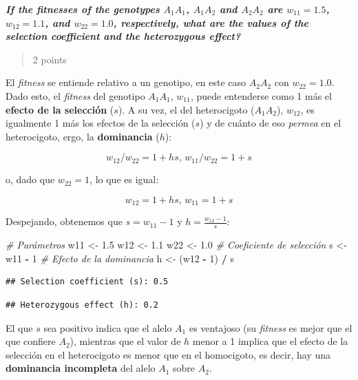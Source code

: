 \documentclass[
  11pt,
]{article}
\newenvironment{Shaded}{\begin{snugshade}}{\end{snugshade}}
\newcommand{\CommentTok}[1]{\textcolor[rgb]{0.56,0.35,0.01}{\textit{#1}}}
\newcommand{\DecValTok}[1]{\textcolor[rgb]{0.00,0.00,0.81}{#1}}
\newcommand{\FloatTok}[1]{\textcolor[rgb]{0.00,0.00,0.81}{#1}}
\newcommand{\NormalTok}[1]{#1}
\newcommand{\OtherTok}[1]{\textcolor[rgb]{0.56,0.35,0.01}{#1}}
\newcommand{\SpecialCharTok}[1]{\textcolor[rgb]{0.81,0.36,0.00}{\textbf{#1}}}
\begin{document}
\textbf{\emph{If the fitnesses of the genotypes \(A_{1}A_1\),
\(A_{1}A_2\) and \(A_{2}A_2\) are \(w_{11} = 1.5\), \(w_{12} = 1.1\),
and \(w_{22} = 1.0\), respectively, what are the values of the selection
coefficient and the heterozygous effect?}}

\begin{quote}
2 points
\end{quote}

El \emph{fitness} se entiende relativo a un genotipo, en este caso
\(A_{2}A_2\) con \(w_{22} = 1.0\). Dado esto, el \emph{fitness} del
genotipo \(A_{1}A_{1}\), \(w_{11}\), puede entenderse como 1 más el
\textbf{efecto de la selección} (\(s\)). A su vez, el del heterocigoto
(\(A_{1}A_{2}\)), \(w_{12}\), es igualmente 1 más los efectos de la
selección (\(s\)) y de cuánto de eso \emph{permea} en el heterocigoto,
ergo, la \textbf{dominancia} (\(h\)):

\[
w_{12}/w_{22} = 1 + hs \text{, } w_{11}/w_{22} = 1 + s
\]

o, dado que \(w_{22} = 1\), lo que es igual:

\[
w_{12} = 1 + hs \text{, } w_{11} = 1 + s
\]

Despejando, obtenemos que \(s = w_{11} - 1\) y
\(h = \frac{w_{12} - 1}{s}\):

\begin{Shaded}
\begin{Highlighting}[]
\CommentTok{\# Parámetros}
\NormalTok{w11 }\OtherTok{\textless{}{-}} \FloatTok{1.5}
\NormalTok{w12 }\OtherTok{\textless{}{-}} \FloatTok{1.1}
\NormalTok{w22 }\OtherTok{\textless{}{-}} \FloatTok{1.0}
\CommentTok{\# Coeficiente de selección}
\NormalTok{s }\OtherTok{\textless{}{-}}\NormalTok{ w11 }\SpecialCharTok{{-}} \DecValTok{1}
\CommentTok{\# Efecto de la dominancia}
\NormalTok{h }\OtherTok{\textless{}{-}}\NormalTok{ (w12 }\SpecialCharTok{{-}} \DecValTok{1}\NormalTok{) }\SpecialCharTok{/}\NormalTok{ s}
\end{Highlighting}
\end{Shaded}

\begin{verbatim}
## Selection coefficient (s): 0.5
\end{verbatim}

\begin{verbatim}
## Heterozygous effect (h): 0.2
\end{verbatim}

El que \(s\) sea positivo indica que el alelo \(A_1\) es ventajoso (su
\emph{fitness} es mejor que el que confiere \(A_2\)), mientras que el
valor de \(h\) menor a 1 implica que el efecto de la selección en el
heterocigoto es menor que en el homocigoto, es decir, hay una
\textbf{dominancia incompleta} del alelo \(A_1\) sobre \(A_2\).
\end{document}
